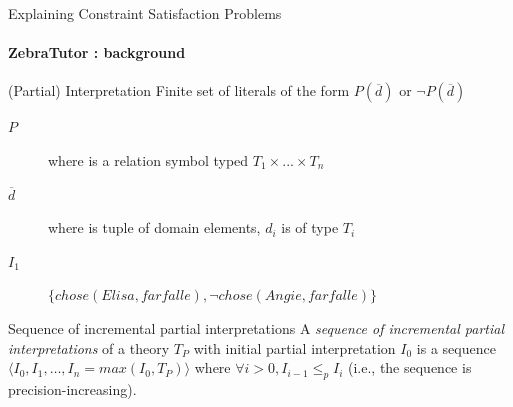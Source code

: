 \documentclass{beamer}
\newcommand\m[1]{\ensuremath{#1}\xspace}
\newcommand\allconstraints{\m{T_P}}
\begin{document}
\begin{frame}{\small{Explaining Constraint Satisfaction Problems}}
    \framesubtitle{ZebraTutor : background}
    \begin{block}{(Partial) Interpretation}
        Finite set of literals of the form $P(\overline{d})$ or $\neg P(\overline{d})$
        \begin{description}
            \item[$P$] {\small where  is a relation symbol typed $T_1 \times ... \times T_n$}
            \item[$\overline{d}$] {\small where  is tuple of domain elements, $d_i$ is of type $T_i$}
            \item[$I_1$] $\{chose(Elisa, farfalle), \neg chose(Angie, farfalle) \}$
        \end{description}
    \end{block}

    \begin{block}{Sequence of incremental partial interpretations}
        A \textit{sequence of incremental partial interpretations} of a theory $\allconstraints$ with initial partial interpretation $I_0$ is a sequence $\langle I_0, I_1, \ldots, I_n  = max(I_0,\allconstraints)\rangle$ where $\forall i>0, I_{i-1} \leq_p I_{i}$ (i.e., the sequence is precision-increasing).
    \end{block}

\end{frame}



\end{document}
